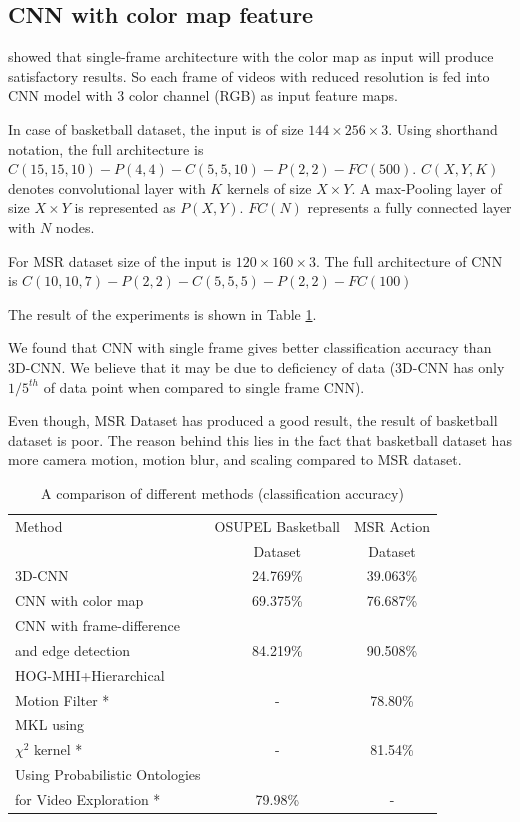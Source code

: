 \subsection{CNN with color map feature}
\citet{KarpathyCVPR14} showed that single-frame architecture with the color map as input will produce satisfactory results.  So each frame of videos with reduced resolution is fed into CNN model with 3 color channel (RGB) as input feature maps.

In case of basketball dataset, the input is of size $144 \times 256 \times 3$.  Using shorthand notation, the full architecture is $C(15, 15, 10)-P(4, 4)-C(5, 5, 10)-P(2, 2)-FC(500)$. $C(X, Y, K)$ denotes convolutional layer with $K$ kernels of size $X \times Y$.  A max-Pooling layer of size $X \times Y$ is represented as $P(X,Y)$. $FC(N)$ represents a fully connected layer with $N$ nodes.

For MSR dataset size of the input is $120 \times 160 \times 3$.  The full architecture of CNN is $C(10, 10, 7)-P(2, 2)-C(5, 5, 5)-P(2, 2)-FC(100)$

The result of the experiments is shown in Table \ref{table:cnn_res}.

We found that CNN with single frame gives better classification accuracy than 3D-CNN.  We believe that it may be due to deficiency of data (3D-CNN has only $1/5^{th}$ of data point when compared to single frame CNN).

Even though, MSR Dataset has produced a good result, the result of basketball dataset is poor.  The reason behind this lies in the fact that basketball dataset has more camera motion, motion blur, and scaling compared to MSR dataset.


\begin{table}[h]
\caption[A comparison of different methods (classification accuracy)]{A comparison of different methods (classification accuracy)}
\label{table:cnn_res}
\centering
\begin{tabular}{|l|c|c|}
\hline
Method & OSUPEL Basketball& MSR Action\\
       & Dataset          &Dataset \\
\hline
\hline
3D-CNN  &24.769\%   &39.063\% \\
\hline
CNN with color map  &69.375\%   &76.687\% \\
\hline
CNN with frame-difference &&\\
and edge detection &84.219\%   &90.508\% \\
\hline
HOG-MHI+Hierarchical &&\\
Motion Filter * \citep{tian2012hierarchical} & -  &78.80\% \\
\hline
MKL using&&\\
$\chi^2$ kernel * \citep{zhao2014feature} & -  &81.54\% \\
\hline
 Using Probabilistic Ontologies&&\\
 for Video Exploration * \citep{bustamante2012using} & 79.98\%   & - \\
\hline  
\end{tabular}
\end{table} 


